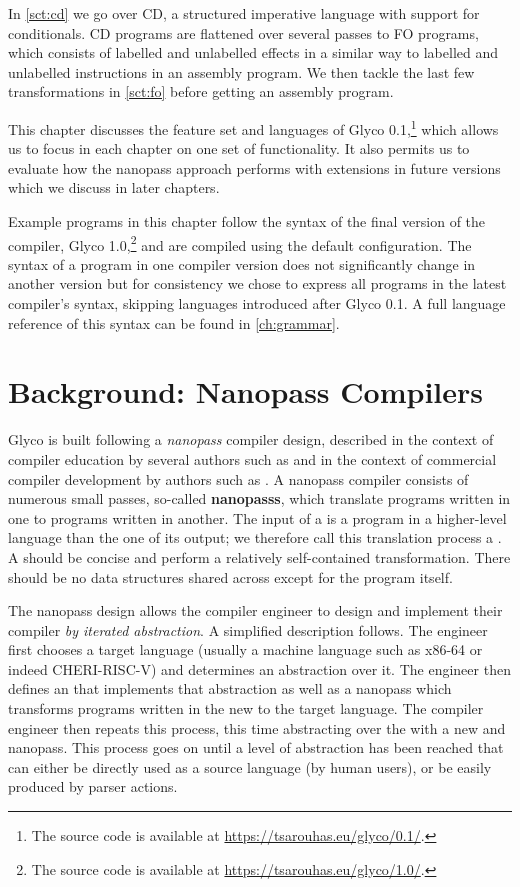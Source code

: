 \documentclass[main.tex]{subfiles}
\begin{document}
In \cref{sct:cd} we go over CD, a structured imperative language with support for conditionals. CD programs are flattened over several passes to FO programs, which consists of labelled and unlabelled effects in a similar way to labelled and unlabelled instructions in an assembly program. We then tackle the last few transformations in \cref{sct:fo} before getting an assembly program.

This chapter discusses the feature set and languages of Glyco 0.1,\footnote{The source code is available at \url{https://tsarouhas.eu/glyco/0.1/}.} which allows us to focus in each chapter on one set of functionality. It also permits us to evaluate how the nanopass approach performs with extensions in future versions which we discuss in later chapters.

Example programs in this chapter follow the syntax of the final version of the compiler, Glyco 1.0,\footnote{The source code is available at \url{https://tsarouhas.eu/glyco/1.0/}.} and are compiled using the default configuration. The syntax of a program in one compiler version does not significantly change in another version but for consistency we chose to express all programs in the latest compiler's syntax, skipping languages introduced after Glyco 0.1. A full language reference of this syntax can be found in \cref{ch:grammar}. 

\section{Background: Nanopass Compilers} \label{sct:nanopass}
Glyco is built following a \emph{nanopass} compiler design, described in the context of compiler education by several authors such as \cite{educomp} and in the context of commercial compiler development by authors such as \cite{commcomp}. A nanopass compiler consists of numerous small passes, so-called \textbf{\glspl{nanopass}}, which translate programs written in one \textbf{} to programs written in another. The input of a  is a program in a higher-level language than the one of its output; we therefore call this translation process a \textbf{}. A  should be concise and perform a relatively self-contained transformation. There should be no data structures shared across  except for the program itself.

The nanopass design allows the compiler engineer to design and implement their compiler \emph{by iterated abstraction}. A simplified description follows. The engineer first chooses a target language (usually a machine language such as x86-64 or indeed CHERI-RISC-V) and determines an abstraction over it. The engineer then defines an  that implements that abstraction as well as a \gls{nanopass} which transforms programs written in the new  to the target language. The compiler engineer then repeats this process, this time abstracting over the  with a new  and \gls{nanopass}. This process goes on until a level of abstraction has been reached that can either be directly used as a source language (by human users), or be easily produced by parser actions.
\end{document}
